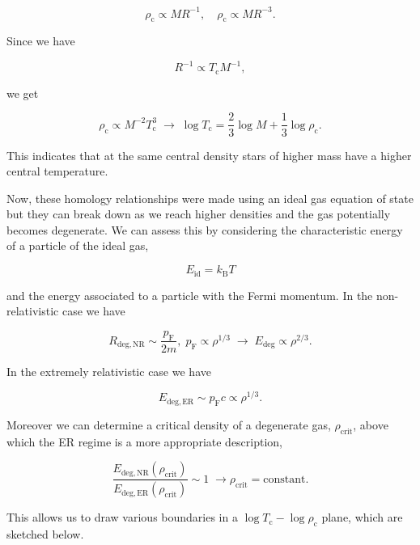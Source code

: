 \documentclass[twocolumn]{article}
\begin{document}
\[\rho_\mathrm{c}\propto MR^{-1},\quad \rho_\mathrm{c}\propto MR^{-3}.\]

Since we have

\[R^{-1}\propto T_\mathrm{c}M^{-1},\]

we get

\[\rho_\mathrm{c}\propto M^{-2}T_\mathrm{c}^3\;\rightarrow\; \log T_\mathrm{c} =\frac{2}{3}\log M + \frac{1}{3}\log \rho_\mathrm{c}.\]

This indicates that at the same central density stars of higher mass
have a higher central temperature.

Now, these homology relationships were made using an ideal gas equation
of state but they can break down as we reach higher densities and the
gas potentially becomes degenerate. We can assess this by considering
the characteristic energy of a particle of the ideal gas,

\[E_\mathrm{id} = k_\mathrm{B}T\]

and the energy associated to a particle with the Fermi momentum. In the
non-relativistic case we have

\[R_\mathrm{deg,NR}\sim \frac{p_\mathrm{F}}{2m},\;p_\mathrm{F}\propto \rho^{1/3}\;\rightarrow\;E_\mathrm{deg}\propto\rho^{2/3}.\]

In the extremely relativistic case we have

\[E_\mathrm{deg, ER}\sim p_\mathrm{F}c\propto \rho^{1/3}.\]

Moreover we can determine a critical density of a degenerate gas,
\(\rho_\mathrm{crit}\), above which the ER regime is a more appropriate
description,

\[\frac{E_\mathrm{deg,NR}(\rho_\mathrm{crit})}{E_\mathrm{deg,ER}(\rho_\mathrm{crit})}\sim 1\;\rightarrow \rho_\mathrm{crit}=\mathrm{constant}.\]

This allows us to draw various boundaries in a
\(\log T_\mathrm{c}-\log \rho_\mathrm{c}\) plane, which are sketched
below.
\end{document}
